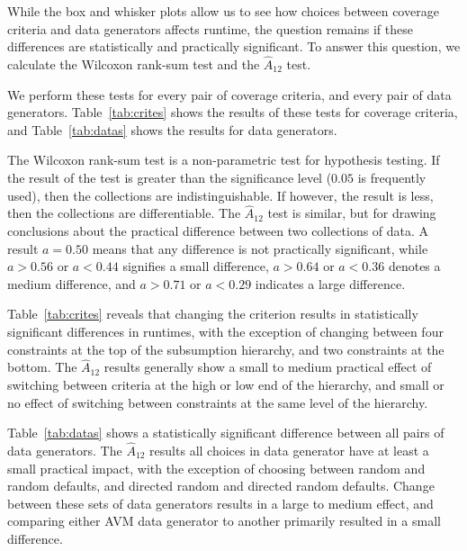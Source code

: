 
While the box and whisker plots allow us to see how choices between coverage criteria and data generators affects
runtime, the question remains if these differences are statistically and practically significant. To answer this
question, we calculate the Wilcoxon rank-sum test and the $\hat{A}_{12}$ test.

We perform these tests for every pair of coverage criteria, and every pair of data generators.  Table~\ref{tab:crites}
shows the results of these tests for coverage criteria, and Table~\ref{tab:datas} shows the results for data generators.

The Wilcoxon rank-sum test is a non-parametric test for hypothesis testing.  If the result of the test is greater than
the significance level ($0.05$ is frequently used), then the collections are indistinguishable.  If however, the result
is less, then the collections are differentiable.  The $\hat{A}_{12}$ test is similar, but for drawing conclusions about
the practical difference between two collections of data.  A result $a=0.5$0 means that any difference is not practically
significant, while $a>0.56$ or $a<0.44$ signifies a small difference, $a>0.64$ or $a<0.36$ denotes a medium difference,
and $a>0.71$ or $a<0.29$ indicates a large difference.

Table~\ref{tab:crites} reveals that changing the criterion results in statistically significant differences in runtimes,
with the exception of changing between four constraints at the top of the subsumption hierarchy, and two constraints at
the bottom.  The $\hat{A}_{12}$ results generally show a small to medium practical effect of switching between criteria
at the high or low end of the hierarchy, and small or no effect of switching between constraints at the same level of the
hierarchy.


Table~\ref{tab:datas} shows a statistically significant difference between all pairs of data generators. The
$\hat{A}_{12}$ results all choices in data generator have at least a small practical impact, with the exception of
choosing between random and random defaults, and directed random and directed random defaults.  Change between these
sets of data generators results in a large to medium effect, and comparing either AVM data generator to another
primarily resulted in a small difference.
